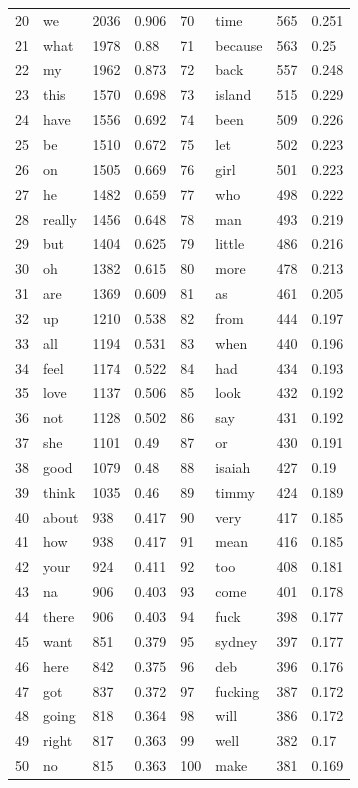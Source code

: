 \documentclass[11pt]{article}
\begin{document}
\begin{center}
\begin{tabular}{llllllll}
20 & we & 2036 & 0.906 & 70 & time & 565 & 0.251 \\
21 & what & 1978 & 0.88 & 71 & because & 563 & 0.25 \\
22 & my & 1962 & 0.873 & 72 & back & 557 & 0.248 \\
23 & this & 1570 & 0.698 & 73 & island & 515 & 0.229 \\
24 & have & 1556 & 0.692 & 74 & been & 509 & 0.226 \\
25 & be & 1510 & 0.672 & 75 & let & 502 & 0.223 \\
26 & on & 1505 & 0.669 & 76 & girl & 501 & 0.223 \\
27 & he & 1482 & 0.659 & 77 & who & 498 & 0.222 \\
28 & really & 1456 & 0.648 & 78 & man & 493 & 0.219 \\
29 & but & 1404 & 0.625 & 79 & little & 486 & 0.216 \\
30 & oh & 1382 & 0.615 & 80 & more & 478 & 0.213 \\
31 & are & 1369 & 0.609 & 81 & as & 461 & 0.205 \\
32 & up & 1210 & 0.538 & 82 & from & 444 & 0.197 \\
33 & all & 1194 & 0.531 & 83 & when & 440 & 0.196 \\
34 & feel & 1174 & 0.522 & 84 & had & 434 & 0.193 \\
35 & love & 1137 & 0.506 & 85 & look & 432 & 0.192 \\
36 & not & 1128 & 0.502 & 86 & say & 431 & 0.192 \\
37 & she & 1101 & 0.49 & 87 & or & 430 & 0.191 \\
38 & good & 1079 & 0.48 & 88 & isaiah & 427 & 0.19 \\
39 & think & 1035 & 0.46 & 89 & timmy & 424 & 0.189 \\
40 & about & 938 & 0.417 & 90 & very & 417 & 0.185 \\
41 & how & 938 & 0.417 & 91 & mean & 416 & 0.185 \\
42 & your & 924 & 0.411 & 92 & too & 408 & 0.181 \\
43 & na & 906 & 0.403 & 93 & come & 401 & 0.178 \\
44 & there & 906 & 0.403 & 94 & fuck & 398 & 0.177 \\
45 & want & 851 & 0.379 & 95 & sydney & 397 & 0.177 \\
46 & here & 842 & 0.375 & 96 & deb & 396 & 0.176 \\
47 & got & 837 & 0.372 & 97 & fucking & 387 & 0.172 \\
48 & going & 818 & 0.364 & 98 & will & 386 & 0.172 \\
49 & right & 817 & 0.363 & 99 & well & 382 & 0.17 \\
50 & no & 815 & 0.363 & 100 & make & 381 & 0.169 \\
\bottomrule
\end{tabular}
\end{center}
\end{document}
